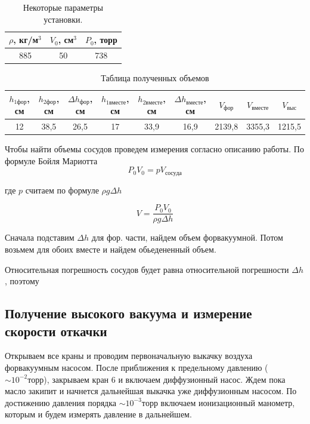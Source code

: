 \documentclass[a4paper,12pt]{article}
\begin{document}
    \begin{table}[H]
        \centering
    \begin{tabular}{|c|c|c|}
    \hline
    $\rho$, кг/м$^3$ & $V_0$, см$^3$ & $P_0$, торр  \\ \hline
     885              &     50        &    738                        \\ \hline
    \end{tabular}
    \caption{Некоторые параметры установки.}
    \end{table}

    \begin{table}[!ht]
        \centering
        \begin{tabular}{|c|c|c|c|c|c|c|c|c|}
        \hline
            $h_{1фор}$, см & $h_{2фор}$, см & $\Delta h_{фор}$, см  & $h_{1вместе}$, см  & $h_{2вместе}$, см & $\Delta h_{вместе}$, см & $V_{фор}$ & $V_{вместе}$ & $V_{выс}$ \\ \hline
            12 & 38,5 & 26,5 & 17 & 33,9 & 16,9 & 2139,8 & 3355,3 & 1215,5 \\ \hline
        \end{tabular}
        \caption{Таблица полученных объемов}
    \end{table}

    Чтобы найти объемы сосудов проведем измерения согласно описанию работы. По формуле Бойля Мариотта 
    \[ P_0 V_0 = p V_{сосуда} \]

    где $p$ считаем по формуле $\rho g \Delta h$ 

    \[ V = \dfrac{P_0 V_0}{\rho g \Delta h} \] 

    Сначала подставим $\Delta h$ для фор. части, найдем объем форвакуумной. Потом возьмем для обоих вместе и найдем обьедененный объем. 

    Относительная погрешность сосудов будет равна относительной погрешности $\Delta h$, поэтому
    
	\subsection*{Получение высокого вакуума и измерение скорости откачки}

    Открываем все краны и проводим первоначальную выкачку воздуха форвакуумным насосом. После приближения к предельному давлению ($\sim 10^{-2}торр$), закрываем кран 6 и включаем диффузионный насос. Ждем пока масло закипит и начнется дальнейшая выкачка уже диффузионным насосом. По достижению давления порядка $\sim 10^{-3}торр$ включаем ионизационный манометр, которым и будем измерять давление в дальнейшем.
\end{document}
